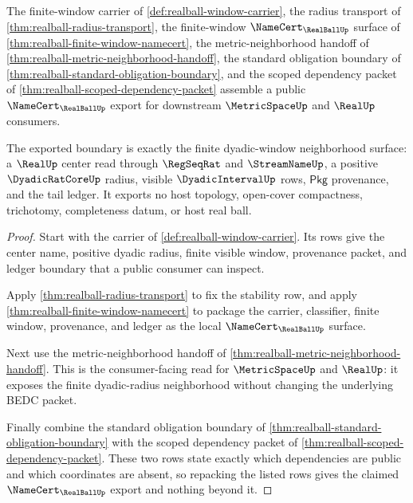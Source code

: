 \begin{theorem}
\label{thm:realball-public-namecert-export}
The finite-window carrier of \autoref{def:realball-window-carrier}, the radius transport of \autoref{thm:realball-radius-transport}, the finite-window $\NameCert_{\RealBallUp}$ surface of \autoref{thm:realball-finite-window-namecert}, the metric-neighborhood handoff of \autoref{thm:realball-metric-neighborhood-handoff}, the standard obligation boundary of \autoref{thm:realball-standard-obligation-boundary}, and the scoped dependency packet of \autoref{thm:realball-scoped-dependency-packet} assemble a public $\NameCert_{\RealBallUp}$ export for downstream $\MetricSpaceUp$ and $\RealUp$ consumers.

The exported boundary is exactly the finite dyadic-window neighborhood surface: a $\RealUp$ center read through $\RegSeqRat$ and $\StreamNameUp$, a positive $\DyadicRatCoreUp$ radius, visible $\DyadicIntervalUp$ rows, $\mathsf{Pkg}$ provenance, and the tail ledger. It exports no host topology, open-cover compactness, trichotomy, completeness datum, or host real ball.
\end{theorem}
\begin{proof}
Start with the carrier of \autoref{def:realball-window-carrier}. Its rows give the center name, positive dyadic radius, finite visible window, provenance packet, and ledger boundary that a public consumer can inspect.

Apply \autoref{thm:realball-radius-transport} to fix the stability row, and apply \autoref{thm:realball-finite-window-namecert} to package the carrier, classifier, finite window, provenance, and ledger as the local $\NameCert_{\RealBallUp}$ surface.

Next use the metric-neighborhood handoff of \autoref{thm:realball-metric-neighborhood-handoff}. This is the consumer-facing read for $\MetricSpaceUp$ and $\RealUp$: it exposes the finite dyadic-radius neighborhood without changing the underlying BEDC packet.

Finally combine the standard obligation boundary of \autoref{thm:realball-standard-obligation-boundary} with the scoped dependency packet of \autoref{thm:realball-scoped-dependency-packet}. These two rows state exactly which dependencies are public and which coordinates are absent, so repacking the listed rows gives the claimed $\NameCert_{\RealBallUp}$ export and nothing beyond it.
\end{proof}

